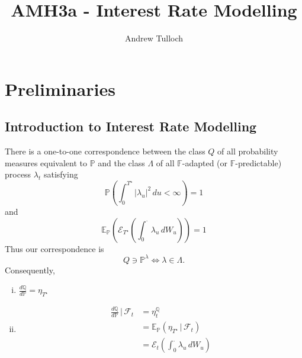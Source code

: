 \documentclass[10pt, oneside, reqno]{amsbook}
\title{AMH3a - Interest Rate Modelling}								%
\author{Andrew Tulloch}
\theoremstyle{plain}%
\theoremstyle{definition}
\theoremstyle{remark}
\newcommand{\given}{ \, | \,}
\newcommand{\sigf}{\mathcal{F}}
\newcommand{\Q}{\mathbb{Q}}
\newcommand{\E}{\mathbb{E}}
\renewcommand{\P}{\mathbb{P}}
\newcommand{\F}{\mathbb{F}}
\newcommand{\doleans}[1]{\mathcal E_t \left(\int_0^\cdot #1 \right)}
\numberwithin{equation}{chapter}
\begin{document}

\maketitle

\tableofcontents

\chapter{Preliminaries} %
\label{cha:preliminaries}

\section{Introduction to Interest Rate Modelling} %
\label{sec:introduction_to_interest_rate_modelling}

There is a one-to-one correspondence between the class $Q$ of all probability measures equivalent to $\P$ and the class $\Lambda$ of all $\F$-adapted (or $\F$-predictable) process $\lambda_t$ satisfying \[
	\P\left(\int_0^{T^\star} |\lambda_u|^2 \, du < \infty \right) = 1
\]
and \[
	\E_\P\left( \mathcal{E}_{T^\star} \left(\int_0^\cdot \lambda_u \, dW_u\right) \right) = 1
\] 
Thus our correspondence is \[Q \ni \P^\lambda \iff \lambda \in \Lambda.\]
Consequently, \begin{enumerate}[(i)]
	\item $\frac{d\Q}{d\P} = \eta_{T^\star}$
	\item \begin{align*}
		\frac{d\Q}{d\P} \given \sigf_t 	&= \eta^\Q_t \\
										&= \E_\P\left(\eta_{T^\star} \given \sigf_t \right) \\
										&= \doleans{\lambda_u \, dW_u}
	\end{align*}
\end{enumerate}
\end{document}
